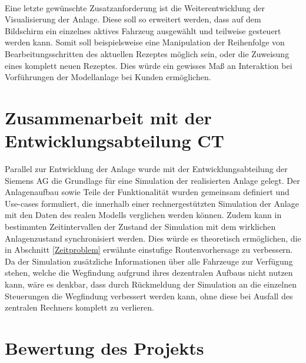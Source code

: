 	\\[4pt]
	Eine letzte gewünschte Zusatzanforderung ist die Weiterentwicklung der Visualisierung der Anlage. Diese soll so erweitert werden, dass auf dem Bildschirm ein einzelnes aktives Fahrzeug ausgewählt und teilweise gesteuert werden kann. Somit soll beispielsweise eine Manipulation der Reihenfolge von Bearbeitungsschritten des aktuellen Rezeptes möglich sein, oder die Zuweisung eines komplett neuen Rezeptes. Dies würde ein gewisses Maß an Interaktion bei Vorführungen der Modellanlage bei Kunden ermöglichen.

\section{Zusammenarbeit mit der Entwicklungsabteilung \ac{CT}}

	Parallel zur Entwicklung der Anlage wurde mit der Entwicklungsabteilung der Siemens AG die Grundlage für eine Simulation der realisierten Anlage gelegt. Der Anlagenaufbau sowie Teile der Funktionalität wurden gemeinsam definiert und Use-cases formuliert, die innerhalb einer rechnergestützten Simulation der Anlage mit den Daten des realen Modells verglichen werden können. Zudem kann in bestimmten Zeitintervallen der Zustand der Simulation mit dem wirklichen Anlagenzustand synchronisiert werden. Dies würde es theoretisch ermöglichen, die in Abschnitt \ref{Zeitproblem} erwähnte einstufige Routenvorhersage zu verbessern. Da der Simulation zusätzliche Informationen über alle Fahrzeuge zur Verfügung stehen, welche die Wegfindung aufgrund ihres dezentralen Aufbaus nicht nutzen kann, wäre es denkbar, dass durch Rückmeldung der Simulation an die einzelnen Steuerungen die Wegfindung verbessert werden kann, ohne diese bei Ausfall des zentralen Rechners komplett zu verlieren.
	
\section{Bewertung des Projekts}
	
